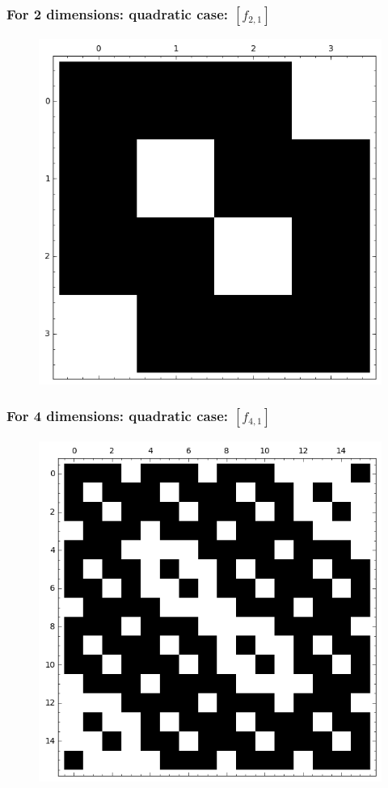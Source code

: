 \documentclass[pdf,sprung,slideColor,nocolorBG]{beamer}
\newenvironment{colortheme}[1]{
\def\ProvidesPackageRCS $##1${\relax}
\renewcommand{\ProcessOptions}{\relax}
\makeatletter

\makeatother
}{}
\begin{document}
\begin{colortheme}{jubata}

\begin{frame}
\frametitle{For 2 dimensions: quadratic case: $[f_{2,1}]$}
\begin{figure}
\centering
\begin{minipage}{.48\textwidth}
  \centering
  \includegraphics[width=.9\linewidth]{../matrix_plot/c2_1_bent_cayley_graph_index_matrix.png}
  \label{fig:q2_1_bent_cayley_graph_index_matrix}
\end{minipage}
\end{figure}
\end{frame}
\begin{frame}
\frametitle{For 4 dimensions: quadratic case: $[f_{4,1}]$}
\begin{figure}
\centering
\begin{minipage}{.48\textwidth}
  \centering
  \includegraphics[width=.9\linewidth]{../matrix_plot/c4_1_bent_cayley_graph_index_matrix.png}

\end{minipage}
\end{figure}
\end{frame}
\end{colortheme}
\end{document}
